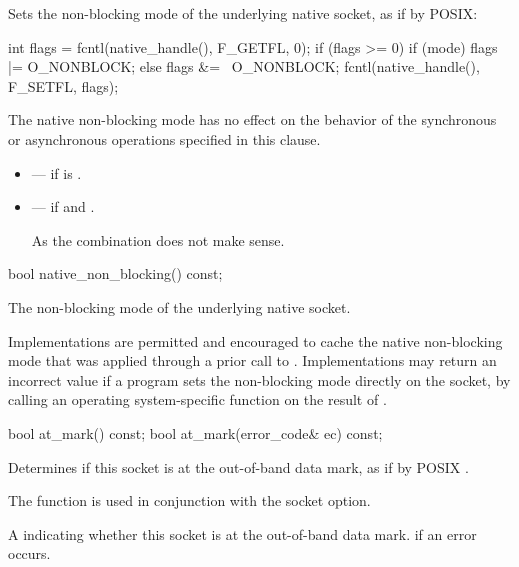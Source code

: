\begin{itemdescr}
\pnum
\effects Sets the non-blocking mode of the underlying native socket, as if by POSIX:
\begin{codeblock}
int flags = fcntl(native_handle(), F_GETFL, 0);
if (flags >= 0)
{
  if (mode)
    flags |= O_NONBLOCK;
  else
    flags &= ~O_NONBLOCK;
  fcntl(native_handle(), F_SETFL, flags);
}
\end{codeblock}


\pnum
 The native non-blocking mode has no effect on the behavior of the synchronous or asynchronous operations specified in this clause.

\pnum
\errors
\begin{itemize}
\item
{} --- if  is .
\item
{} --- if  and . \begin{note} As the combination does not make sense. \end{note}
\end{itemize}
\end{itemdescr}

\begin{itemdecl}
bool native_non_blocking() const;
\end{itemdecl}

\begin{itemdescr}
\pnum
\returns The non-blocking mode of the underlying native socket.

\pnum
\remarks Implementations are permitted and encouraged to cache the native non-blocking mode that was applied through a prior call to . Implementations may return an incorrect value if a program sets the non-blocking mode directly on the socket, by calling an operating system-specific function on the result of .
\end{itemdescr}

\begin{itemdecl}
bool at_mark() const;
bool at_mark(error_code& ec) const;
\end{itemdecl}

\begin{itemdescr}
\pnum
\effects Determines if this socket is at the out-of-band data mark, as if by POSIX . \begin{note} The  function is used in conjunction with the  socket option. \end{note}

\pnum
\returns A  indicating whether this socket is at the out-of-band data mark.  if an error occurs.
\end{itemdescr}

